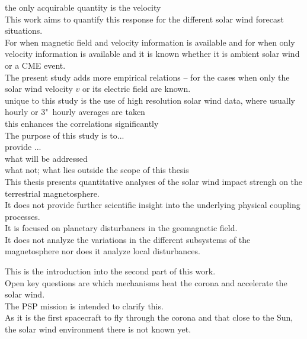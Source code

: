 the only acquirable quantity is the velocity\\



This work aims to quantify this response for the different solar wind forecast situations.\\
For when magnetic field and velocity information is available and for when only velocity information is available and it is known whether it is ambient solar wind or a CME event.\\
The present study adds more empirical \Kp{} relations -- for the cases when only the solar wind velocity $v$ or its electric field \vBz{} are known.\\

unique to this study is the use of high resolution solar wind data, where usually hourly or 3"~hourly averages are taken\\
this enhances the correlations significantly\\


The purpose of this study is to...\\
provide ...\\


what will be addressed\\
what not; what lies outside the scope of this thesis\\
This thesis presents quantitative analyses of the solar wind impact strengh on the terrestrial magnetosphere.\\
It does not provide further scientific insight into the underlying physical coupling processes.\\
It is focused on planetary disturbances in the geomagnetic field.\\
It does not analyze the variations in the different subsystems of the magnetosphere nor does it analyze local disturbances.\\



\bigskip


This is the introduction into the second part of this work.\\



Open key questions are which mechanisms heat the corona and accelerate the solar wind.\\
The PSP mission is intended to clarify this.\\
As it is the first spacecraft to fly through the corona and that close to the Sun, the solar wind environment there is not known yet.\\

